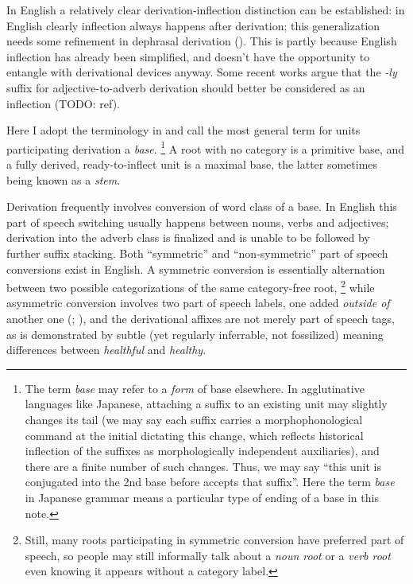 \documentclass[UTF8, a4paper, oneside, scheme=plain, 12pt]{ctexbook}
\newcommand*{\citepage}[1]{p.~{#1}}
\newcommand*{\term}[1]{\emph{#1}}
\newcommand{\form}[1]{\emph{#1}}
\begin{document}
In English a relatively clear derivation-inflection distinction can be established:
in English clearly inflection always happens after derivation;
this generalization needs some refinement in dephrasal derivation ().
This is partly because English inflection has already been simplified,
and doesn't have the opportunity to entangle with derivational devices anyway.
Some recent works argue that the \form{-ly} suffix for adjective-to-adverb derivation 
should better be considered as an inflection (TODO: ref).

Here I adopt the terminology in \citet{cgel}
and call the most general term for units participating derivation a \term{base}.%
\footnote{
    The term \term{base} may refer to a \emph{form} of base elsewhere.
    In agglutinative languages like Japanese,
    attaching a suffix to an existing unit may slightly changes its tail
    (we may say each suffix carries a morphophonological command at the initial
    dictating this change,
    which reflects historical inflection of the suffixes as 
    morphologically independent auxiliaries),
    and there are a finite number of such changes.
    Thus, we may say ``this unit is conjugated into the 2nd base before accepts that suffix''.
    Here the term \term{base} in Japanese grammar
    means a particular type of ending 
    of a base in this note.
}
A root with no category is a primitive base,
and a fully derived, ready-to-inflect unit is a maximal base,
the latter sometimes being known as a \term{stem}.


Derivation frequently involves conversion of word class of a base.
In English this part of speech switching usually happens between 
nouns, verbs and adjectives;
derivation into the adverb class is finalized 
and is unable to be followed by further suffix stacking.
Both ``symmetric'' and ``non-symmetric'' part of speech conversions exist in English.
A symmetric conversion is essentially 
alternation between two possible categorizations of the same category-free root,%
\footnote{
    Still, many roots participating in symmetric conversion 
    have preferred part of speech,
    so people may still informally talk about a \term{noun root} or a \term{verb root}
    even knowing it appears without a category label.
}
while asymmetric conversion involves two part of speech labels,
one added \emph{outside of} another one 
(\citealt[\citepage{1641}]{cgel}; \citealt[\citepage{62}, (15)]{siddiqi2009syntax}),
and the derivational affixes are not merely part of speech tags,
as is demonstrated by 
subtle (yet regularly inferrable, not fossilized) meaning differences between 
\form{healthful} and \form{healthy}.
\end{document}
